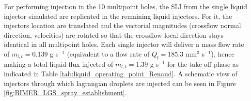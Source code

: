 

For performing injection in the 10 multipoint holes, the SLI from the single liquid injector simulated are replicated in the remaining liquid injectors. For it, the injectors location are translated and the vectorial magnitudes (crossflow normal direction, velocities) are rotated so that the crossflow local direction stays identical in all multipoint holes. Each single injector will deliver a mass flow rate of $\dot{m}_{l,t} = 0.139$ g s$^{-1}$ (equivalent to a flow rate of $Q_l = 185.3$ mm$^3$ s$^{-1}$), hence making a total liquid flux injected of $\dot{m}_{l,t} = 1.39$ g s$^{-1}$ for the take-off phase as indicated in Table \ref{tab:liquid_operating_point_Renaud}. A schematic view of injectors through which lagrangian droplets are injected can be seen in Figure \ref{fig:BIMER_LGS_spray_establishment}.


